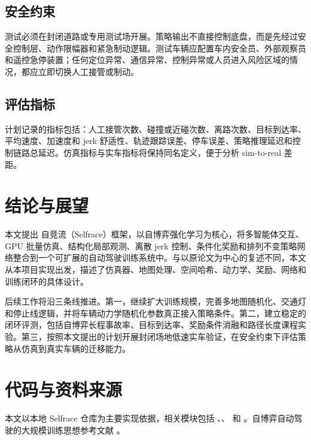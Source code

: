 \documentclass[preprint,12pt]{elsarticle}
\newcommand{\Selfrace}{Selfrace}
\newcommand{\Zijingliu}{自竞流}
\begin{document}
\subsection{安全约束}

测试必须在封闭道路或专用测试场开展。策略输出不直接控制底盘，而是先经过安全控制层、动作限幅器和紧急制动逻辑。测试车辆应配置车内安全员、外部观察员和遥控急停装置；任何定位异常、通信异常、控制异常或人员进入风险区域的情况，都应立即切换人工接管或制动。

\subsection{评估指标}

计划记录的指标包括：人工接管次数、碰撞或近碰次数、离路次数、目标到达率、平均速度、加速度和 jerk 舒适性、轨迹跟踪误差、停车误差、策略推理延迟和控制链路总延迟。仿真指标与实车指标将保持同名定义，便于分析 sim-to-real 差距。

\section{结论与展望}

本文提出 \Zijingliu{}（\Selfrace{}）框架，以自博弈强化学习为核心，将多智能体交互、GPU 批量仿真、结构化局部观测、离散 jerk 控制、条件化奖励和排列不变策略网络整合到一个可扩展的自动驾驶训练系统中。与以原论文为中心的复述不同，本文从本项目实现出发，描述了仿真器、地图处理、空间哈希、动力学、奖励、网络和训练闭环的具体设计。

后续工作将沿三条线推进。第一，继续扩大训练规模，完善多地图随机化、交通灯和停止线逻辑，并将车辆动力学随机化参数真正接入策略条件。第二，建立稳定的闭环评测，包括自博弈长程事故率、目标到达率、奖励条件消融和路径长度课程实验。第三，按照本文提出的计划开展封闭场地低速实车验证，在安全约束下评估策略从仿真到真实车辆的迁移能力。

\section*{代码与资料来源}

本文以本地 \Selfrace{} 仓库为主要实现依据，相关模块包括 、、 和 。自博弈自动驾驶的大规模训练思想参考文献 \citep{cusumano2025robust}。



\end{document}
